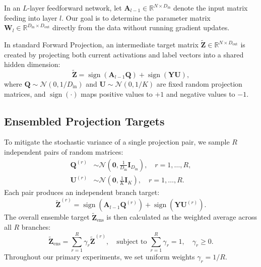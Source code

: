 \documentclass[journal]{IEEEtran}
\begin{document}
In an $L$-layer feedforward network, let $\mathbf{A}_{l-1} \in \mathbb{R}^{N \times D_{\text{in}}}$ denote the input matrix feeding into layer $l$. Our goal is to determine the parameter matrix $\mathbf{W}_l \in \mathbb{R}^{D_{\text{in}} \times D_{\text{out}}}$ directly from the data without running gradient updates.

In standard Forward Projection, an intermediate target matrix $\tilde{\mathbf{Z}} \in \mathbb{R}^{N \times D_{\text{out}}}$ is created by projecting both current activations and label vectors into a shared hidden dimension:
\begin{equation}
\tilde{\mathbf{Z}} = \operatorname{sign}(\mathbf{A}_{l-1} \mathbf{Q}) + \operatorname{sign}(\mathbf{Y} \mathbf{U}),
\end{equation}
where $\mathbf{Q} \sim \mathcal{N}(0, 1/D_{\text{in}})$ and $\mathbf{U} \sim \mathcal{N}(0, 1/K)$ are fixed random projection matrices, and $\operatorname{sign}(\cdot)$ maps positive values to $+1$ and negative values to $-1$.

\subsection{Ensembled Projection Targets}
To mitigate the stochastic variance of a single projection pair, we sample $R$ independent pairs of random matrices:
\begin{align}
\mathbf{Q}^{(r)} &\sim \mathcal{N}\left(\mathbf{0}, \frac{1}{D_{\text{in}}} \mathbf{I}_{D_{\text{in}}}\right), \quad r = 1, \dots, R, \\
\mathbf{U}^{(r)} &\sim \mathcal{N}\left(\mathbf{0}, \frac{1}{K} \mathbf{I}_{K}\right), \quad r = 1, \dots, R.
\end{align}
Each pair produces an independent branch target:
\begin{equation}
\tilde{\mathbf{Z}}^{(r)} = \operatorname{sign}\left(\mathbf{A}_{l-1} \mathbf{Q}^{(r)}\right) + \operatorname{sign}\left(\mathbf{Y} \mathbf{U}^{(r)}\right).
\end{equation}
The overall ensemble target $\tilde{\mathbf{Z}}_{\text{ens}}$ is then calculated as the weighted average across all $R$ branches:
\begin{equation}
\label{eq:ensemble_target}
\tilde{\mathbf{Z}}_{\text{ens}} = \sum_{r=1}^R \gamma_r \tilde{\mathbf{Z}}^{(r)}, \quad \text{subject to } \sum_{r=1}^R \gamma_r = 1, \quad \gamma_r \ge 0.
\end{equation}
Throughout our primary experiments, we set uniform weights $\gamma_r = 1/R$.
\end{document}
